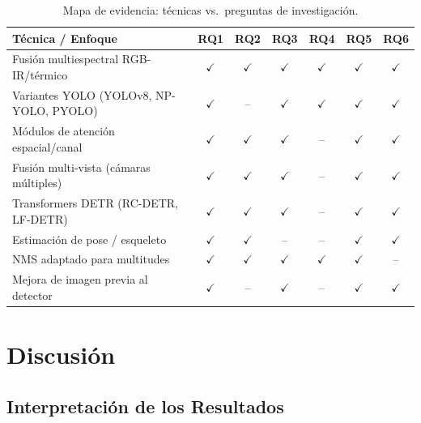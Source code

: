 \documentclass[12pt, a4paper]{article}
\begin{document}
\begin{table}[H]
\centering
\caption{Mapa de evidencia: t\'{e}cnicas vs.\ preguntas de
investigaci\'{o}n.}
\label{tab:mapa}
\begin{tabular}{p{5.5cm}cccccc}
\toprule
\textbf{T\'{e}cnica / Enfoque} &
\textbf{RQ1} & \textbf{RQ2} & \textbf{RQ3} &
\textbf{RQ4} & \textbf{RQ5} & \textbf{RQ6} \\
\midrule
Fusi\'{o}n multiespectral RGB-IR/t\'{e}rmico
  & $\checkmark$ & $\checkmark$ & $\checkmark$ & $\checkmark$ & $\checkmark$ & $\checkmark$ \\
Variantes YOLO (YOLOv8, NP-YOLO, PYOLO)
  & $\checkmark$ & {--} & $\checkmark$ & $\checkmark$ & $\checkmark$ & $\checkmark$ \\
M\'{o}dulos de atenci\'{o}n espacial/canal
  & $\checkmark$ & $\checkmark$ & $\checkmark$ & {--} & $\checkmark$ & $\checkmark$ \\
Fusi\'{o}n multi-vista (c\'{a}maras m\'{u}ltiples)
  & $\checkmark$ & $\checkmark$ & $\checkmark$ & {--} & $\checkmark$ & $\checkmark$ \\
Transformers DETR (RC-DETR, LF-DETR)
  & $\checkmark$ & $\checkmark$ & $\checkmark$ & {--} & $\checkmark$ & $\checkmark$ \\
Estimaci\'{o}n de pose / esqueleto
  & $\checkmark$ & $\checkmark$ & {--} & {--} & $\checkmark$ & $\checkmark$ \\
NMS adaptado para multitudes
  & $\checkmark$ & $\checkmark$ & $\checkmark$ & $\checkmark$ & $\checkmark$ & {--} \\
Mejora de imagen previa al detector
  & $\checkmark$ & {--} & $\checkmark$ & {--} & $\checkmark$ & $\checkmark$ \\
\bottomrule
\end{tabular}
\end{table}

\section{Discusi\'{o}n}
\label{sec:discusion}

\subsection{Interpretaci\'{o}n de los Resultados}
\end{document}

